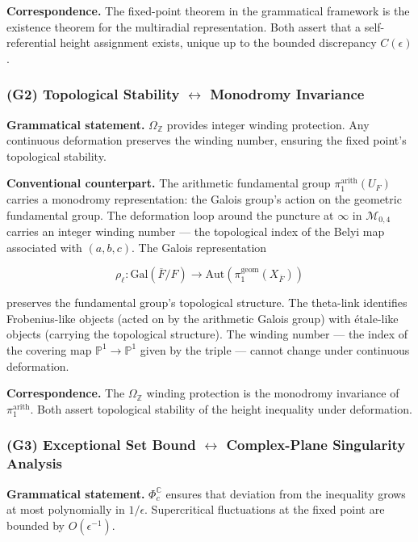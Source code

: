 \documentclass[12pt,a4paper]{article}
\begin{document}
\textbf{Correspondence.} The fixed-point theorem in the grammatical framework is the existence theorem for the multiradial representation. Both assert that a self-referential height assignment exists, unique up to the bounded discrepancy $C(\epsilon)$.

\subsubsection{(G2) Topological Stability $\leftrightarrow$ Monodromy Invariance}

\textbf{Grammatical statement.} $\Omega_\mathbb{Z}$ provides integer winding protection. Any continuous deformation preserves the winding number, ensuring the fixed point's topological stability.

\textbf{Conventional counterpart.} The arithmetic fundamental group $\pi_1^{\text{arith}}(U_F)$ carries a monodromy representation: the Galois group's action on the geometric fundamental group. The deformation loop around the puncture at $\infty$ in $\mathcal{M}_{0,4}$ carries an integer winding number --- the topological index of the Belyi map associated with $(a, b, c)$. The Galois representation

\[\rho_{\ell}: \text{Gal}(\overline{F}/F) \to \text{Aut}(\pi_1^{\text{geom}}(X_{\overline{F}}))\]

preserves the fundamental group's topological structure. The theta-link identifies Frobenius-like objects (acted on by the arithmetic Galois group) with étale-like objects (carrying the topological structure). The winding number --- the index of the covering map $\mathbb{P}^1 \to \mathbb{P}^1$ given by the triple --- cannot change under continuous deformation.

\textbf{Correspondence.} The $\Omega_\mathbb{Z}$ winding protection is the monodromy invariance of $\pi_1^{\text{arith}}$. Both assert topological stability of the height inequality under deformation.

\subsubsection{(G3) Exceptional Set Bound $\leftrightarrow$ Complex-Plane Singularity Analysis}

\textbf{Grammatical statement.} $\Phi_c^\mathbb{C}$ ensures that deviation from the inequality grows at most polynomially in $1/\epsilon$. Supercritical fluctuations at the fixed point are bounded by $O(\epsilon^{-1})$.
\end{document}
